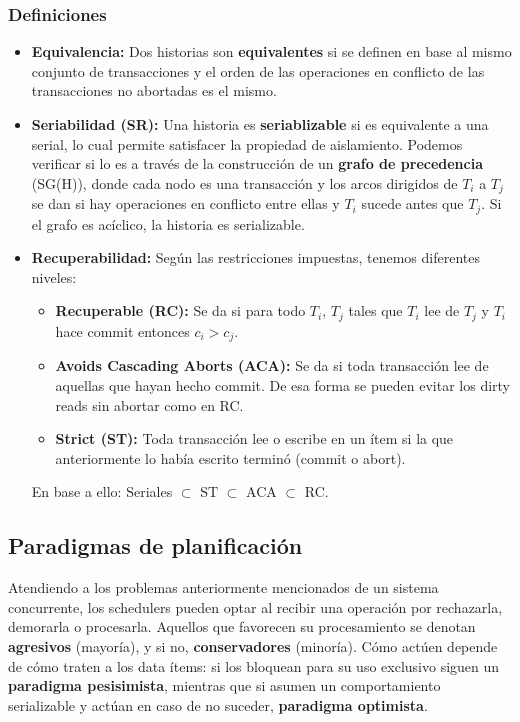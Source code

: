 \subsubsection*{Definiciones}
\begin{itemize}
    \item \textbf{Equivalencia:} Dos historias son \textbf{equivalentes} si se definen en base al mismo conjunto de transacciones y el orden de las operaciones en conflicto de las transacciones no abortadas es el mismo.
    \item \textbf{Seriabilidad (SR):} Una historia es \textbf{seriablizable} si es equivalente a una serial, lo cual permite satisfacer la propiedad de aislamiento. Podemos verificar si lo es a través de la construcción de un \textbf{grafo de precedencia} (SG(H)), donde cada nodo es una transacción y los arcos dirigidos de $T_i$ a $T_j$ se dan si hay operaciones en conflicto entre ellas y $T_i$ sucede antes que $T_j$. Si el grafo es acíclico, la historia es serializable.
    \item \textbf{Recuperabilidad:} Según las restricciones impuestas, tenemos diferentes niveles:
    \begin{itemize}
    \item \textbf{Recuperable (RC):} Se da si para todo $T_i$, $T_j$ tales que $T_i$ lee de $T_j$ y $T_i$ hace commit entonces $c_i > c_j$.
    \item \textbf{Avoids Cascading Aborts (ACA):} Se da si toda transacción lee de aquellas que hayan hecho commit. De esa forma se pueden evitar los dirty reads sin abortar como en RC.
    \item \textbf{Strict (ST):} Toda transacción lee o escribe en un ítem si la que anteriormente lo había escrito terminó (commit o abort).
    \end{itemize}
    En base a ello: Seriales $\subset$ ST $\subset$ ACA $\subset$ RC.    
\end{itemize}

\subsection*{Paradigmas de planificación}
Atendiendo a los problemas anteriormente mencionados de un sistema concurrente, los schedulers pueden optar al recibir una operación por rechazarla, demorarla o procesarla. Aquellos que favorecen su procesamiento se denotan
 \textbf{agresivos} (mayoría), y si no, \textbf{conservadores} (minoría). Cómo actúen depende de cómo traten a los data ítems: si los bloquean para su uso exclusivo siguen un \textbf{paradigma pesisimista}, mientras que si asumen un comportamiento serializable y actúan en caso de no suceder, \textbf{paradigma optimista}.

